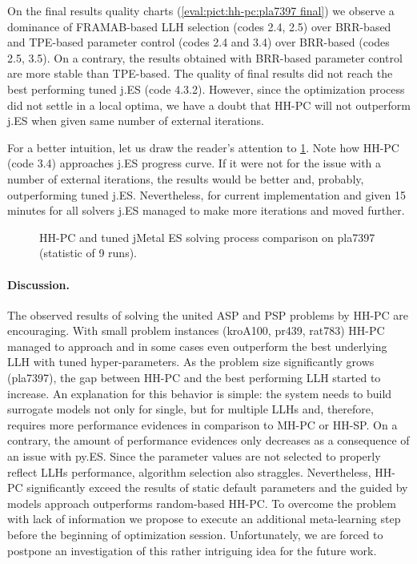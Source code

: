 On the final results quality charts (\cref{eval:pict:hh-pc:pla7397 final}) we observe a dominance of FRAMAB-based LLH selection (codes 2.4, 2.5) over BRR-based and TPE-based parameter control (codes 2.4 and 3.4) over BRR-based (codes 2.5, 3.5). On a contrary, the results obtained with BRR-based parameter control are more stable than TPE-based. The quality of final results did not reach the best performing tuned j.ES (code 4.3.2). However, since the optimization process did not settle in a local optima, we have a doubt that HH-PC will not outperform j.ES when given same number of external iterations.

For a better intuition, let us draw the reader's attention to \cref{eval:pict:hh-pc vs jES on pla7397 process}. Note how HH-PC (code 3.4) approaches j.ES progress curve. If it were not for the issue with a number of external iterations, the results would be better and, probably, outperforming tuned j.ES. Nevertheless, for current implementation and given 15 minutes for all solvers j.ES managed to make more iterations and moved further.

\begin{figure}[h]
	\centering
	\vspace{-5pt}
	
	\caption{HH-PC and tuned jMetal ES solving process comparison on pla7397 (statistic of 9 runs).}
	\vspace{-5pt}
	\label{eval:pict:hh-pc vs jES on pla7397 process}
\end{figure}

\paragraph{Discussion.} The observed results of solving the united ASP and PSP problems by HH-PC are encouraging. With small problem instances (kroA100, pr439, rat783) HH-PC managed to approach and in some cases even outperform the best underlying LLH with tuned hyper-parameters. As the problem size significantly grows (pla7397), the gap between HH-PC and the best performing LLH started to increase. An explanation for this behavior is simple: the system needs to build surrogate models not only for single, but for multiple LLHs and, therefore, requires more performance evidences in comparison to MH-PC or HH-SP. On a contrary, the amount of performance evidences only decreases as a consequence of an issue with py.ES. Since the parameter values are not selected to properly reflect LLHs performance, algorithm selection also straggles. Nevertheless, HH-PC significantly exceed the results of static default parameters and the guided by models approach outperforms random-based HH-PC. To overcome the problem with lack of information we propose to execute an additional meta-learning step before the beginning of optimization session. Unfortunately, we are forced to postpone an investigation of this rather intriguing idea for the future work.


